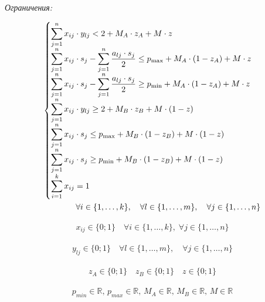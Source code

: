\documentclass[14pt,fleqn]{extarticle}
\begin{document}
	\textit{Ограничения:}
	\begin{ceqn}
		\begin{align*}
			\begin{cases}
				\smashoperator[r]{\sum_{j=1}^{n}} x_{ij} \cdot y_{lj} < 2 + M_A \cdot z_A + M \cdot z\\
				\smashoperator[r]{\sum_{j=1}^{n}} x_{ij} \cdot s_j - \smashoperator[r]{\sum_{j=1}^{n}} \dfrac{a_{lj} \cdot s_j}{2} \leq p_{\max} +  M_A \cdot (1 - z_A) + M \cdot z\\
				\smashoperator[r]{\sum_{j=1}^{n}} x_{ij} \cdot s_j - \smashoperator[r]{\sum_{j=1}^{n}} \dfrac{a_{lj} \cdot s_j}{2} \geq p_{\min} +  M_A \cdot (1 - z_A) + M \cdot z\\
				\smashoperator[r]{\sum_{j=1}^{n}} x_{ij} \cdot y_{lj} \geq 2 + M_B \cdot z_B + M \cdot (1-z)\\
				\smashoperator[r]{\sum_{j=1}^{n}} x_{ij} \cdot s_j \leq p_{\max} +  M_B \cdot (1 - z_B) + M \cdot (1-z)\\
				\smashoperator[r]{\sum_{j=1}^{n}} x_{ij} \cdot s_j \geq p_{\min} + M_B \cdot (1 - z_B) + M \cdot (1-z)\\
				\smashoperator[r]{\sum_{i=1}^{k}} x_{ij} = 1
			\end{cases}\\
			\forall i \in \{1, \dots, k\}, \quad \forall l \in \{1, \dots, m\}, \quad \forall j \in \{1, \dots, n\}
		\end{align*}
	\end{ceqn}

	\begin{ceqn}
		\begin{align*}
			x_{ij} \in \{0;1\} \quad \forall i \in \{1, \dots, k\}, \; \forall j \in \{1, \dots, n\}
		\end{align*}
	\end{ceqn}

	\begin{ceqn}
	\begin{align*}
		y_{lj} \in \{0;1\} \quad \forall l \in \{1, \dots, m\}, \quad \forall j \in \{1, \dots, n\}
	\end{align*}
	\end{ceqn}

	\begin{ceqn}
	\begin{align*}
		z_A \in \{0;1\} \quad z_B \in \{0;1\} \quad z \in \{0;1\}
	\end{align*}
	\end{ceqn}

	\begin{ceqn}
	\begin{align*}
		p_{min} \in \mathbb{R}, \, p_{max} \in \mathbb{R}, \, M_A \in \mathbb{R}, \, M_B \in \mathbb{R}, \, M \in \mathbb{R}
	\end{align*}
	\end{ceqn}
\end{document}
